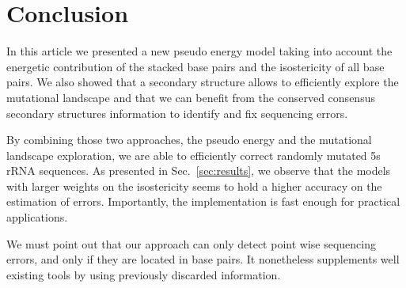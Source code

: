 \section{Conclusion}
\label{sec:conclusion}

In this article we presented a new 
 pseudo energy model taking into account the energetic contribution 
of the stacked base pairs and the isostericity of all base pairs. 
We also showed that a secondary structure allows to efficiently
explore the mutational landscape and that we can benefit from the
 conserved consensus secondary structures  information
to identify and fix sequencing errors.


By combining those two approaches, the pseudo energy and the 
mutational landscape exploration, we are able  to efficiently 
correct randomly mutated 5s rRNA sequences. 
As presented in Sec.~\ref{sec:results},
we observe that the models
with larger weights on the
isostericity seems to hold a higher accuracy on the estimation of errors.
Importantly, the implementation is fast enough for practical applications.

We must point out that our approach can only detect point wise 
sequencing errors, and only if they are located in base pairs. It 
nonetheless supplements well existing tools by using previously discarded
information.